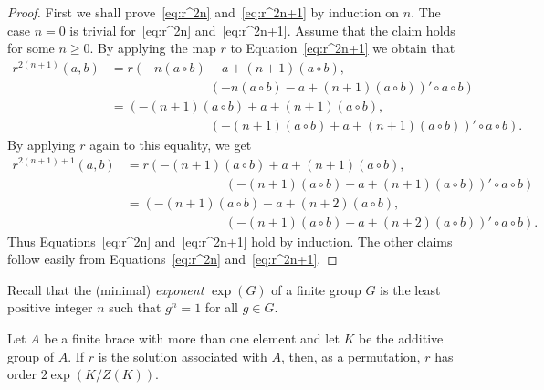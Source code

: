 \begin{proof} 
First we shall prove~\eqref{eq:r^2n} and~\eqref{eq:r^2n+1} by induction on $n$. The case $n=0$ is trivial for~\eqref{eq:r^2n}
  and~\eqref{eq:r^2n+1}. Assume that the claim holds for some $n\geq 0$. By applying the map $r$ to Equation~\eqref{eq:r^2n+1} 
  we obtain that 
  \begin{align*} 
  r^{2(n+1)}(a,b) &=r\left( -n(a\circ b)-a+(n+1)(a\circ b),\right.\\
    &\phantom{=(-n(a\circ b)+} \left. (-n(a\circ b)-a+(n+1)(a\circ
    b))'\circ a\circ b\right)\\
    &=\left( -(n+1)(a\circ b)+a+(n+1)(a\circ b),\right.\\
    &\phantom{=(-n(a\circ b)+} \left. (-(n+1)(a\circ b)+a+(n+1)(a\circ
    b))'\circ a\circ b\right).
    \end{align*} 
    By applying $r$ again to this equality, we get 
    \begin{align*} 
  r^{2(n+1)+1}(a,b) &= r\left(-(n+1)(a\circ b)+a+(n+1)(a\circ
    b),\right.\\
    &\phantom{=(-n(a\circ b)+} \left. (-(n+1)(a\circ b)+a+(n+1)(a\circ b))'\circ a\circ b\right)\\
    &=\left( -(n+1)(a\circ b)-a+(n+2)(a\circ b),\right.\\
    &\phantom{=(-n(a\circ b)+} \left. (-(n+1)(a\circ b)-a+(n+2)(a\circ
    b))'\circ a\circ b\right).
    \end{align*} 
   Thus Equations~\eqref{eq:r^2n} and~\eqref{eq:r^2n+1} hold by induction.  The other claims follow easily from
    Equations~\eqref{eq:r^2n} and~\eqref{eq:r^2n+1}.
\end{proof}

%

Recall that the (minimal) \emph{exponent} $\exp(G)$ of a 
finite group $G$ is the least positive integer $n$ such that 
$g^n=1$ for all $g\in G$. 

\begin{theorem} 
\label{thm:|r|} 
  Let $A$ be a finite brace with more than one
  element and let $K$ be the additive group of $A$. 
  If $r$ is the solution associated with $A$, 
  then, as a permutation, $r$ has order $2\exp(K/Z(K))$.
\end{theorem}

